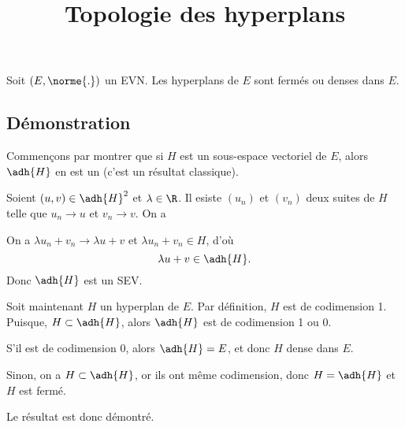 \documentclass[fontsize=12pt,twoside=false,parskip=half]{scrartcl}
\title{Topologie des hyperplans}
\date{}
\author{}
\begin{document}
\maketitle
   \begin{Theoreme}
      Soit $(E, \norme{.})$ un EVN. Les hyperplans de $E$ sont fermés ou denses dans $E$.
   \end{Theoreme}
   \subsection{Démonstration}
      Commençons par montrer que si $H$ est un sous-espace vectoriel de $E$, alors
      $\adh{H}$ en est un (c’est un résultat classique).
      
      Soient $(u, v) \in \adh{H}^2$ et $\lambda \in \R$. Il esiste $(u_n)$ et $(v_n)$
      deux suites de $H$ telle que $u_n \to u$ et $v_n \to v$. On a 
      
      On a $\lambda u_n + v_n \to \lambda u + v$ et $\lambda u_n + v_n \in H$, d’où
      \[
         \lambda u + v \in \adh{H}.
      \]
      Donc $\adh{H}$ est un SEV.
      
      Soit maintenant $H$ un hyperplan de $E$. Par définition, $H$ est de codimension 1.
      Puisque, $H \subset \adh{H}$, alors $\adh{H}$ est de codimension 1 ou 0.
      \begin{description}
         \item S’il est de codimension 0, alors $\adh{H} = E$, et donc 
               $H$ dense dans $E$.
         \item Sinon, on a $H \subset \adh{H}$, or ils ont même codimension, donc $H = \adh{H}$ et $H$ est fermé.
      \end{description}
      Le résultat est donc démontré. 
\end{document}

